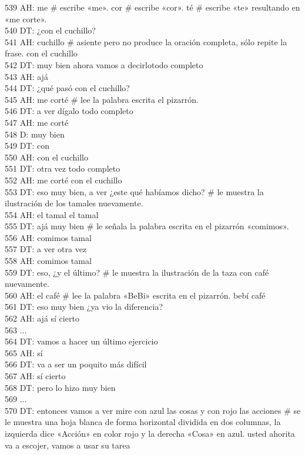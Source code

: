 539 AH: me \# escribe «me». cor # escribe «cor». té # escribe «te» resultando en «me corte».\\
540 DT: ¿con el cuchillo?\\
541 AH: cuchillo \# asiente pero no produce la oración completa, sólo repite la frase. con el cuchillo\\
542 DT: muy bien ahora vamos a decirlotodo completo\\
543 AH: ajá\\
544 DT: ¿qué pasó con el cuchillo?\\
545 AH: me corté \# lee la palabra escrita el pizarrón.\\
546 DT: a ver dígalo todo completo\\
547 AH: me corté\\
548 D: muy bien\\
549 DT: con\\
550 AH: con el cuchillo\\
551 DT: otra vez todo completo\\
552 AH: me corté con el cuchillo\\
553 DT: eso muy bien, a ver ¿este qué habíamos dicho? \# le muestra la ilustración  de los tamales nuevamente.\\
554 AH: el tamal el tamal\\
555 DT: ajá muy bien \# le señala la palabra escrita en el pizarrón «comimos».\\
556 AH: comimos tamal\\
557 DT: a ver otra vez\\
558 AH: comimos tamal\\
559 DT: eso, ¿y el último? \# le muestra la ilustración de la taza con café nuevamente.\\
560 AH: el café \# lee la palabra «BeBi» escrita en el pizarrón. bebí café\\
561 DT: eso muy bien ¿ya vio la diferencia?\\
562 AH: ajá sí cierto\\
563 ...\\
564 DT: vamos a hacer un último ejercicio\\
565 AH: sí\\
566 DT: va a ser un poquito más difícil\\
567 AH: sí cierto\\
568 DT: pero lo hizo muy bien\\
569 ...\\
570 DT: entonces vamos a ver mire con azul las cosas y con rojo las acciones \# se le muestra una hoja blanca de forma horizontal dividida en dos columnas, la izquierda dice «Acción» en color rojo y la derecha «Cosa» en azul. usted ahorita va a escojer, vamos a usar su tarea\\
